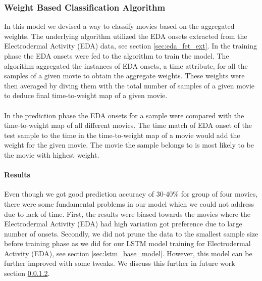 \subsubsection{Weight Based Classification Algorithm} In this model we devised a way to classify movies based on the aggregated weights. The underlying algorithm utilized the EDA onsets extracted from the Electrodermal Activity (EDA) data, see section \ref{sec:eda_fet_ext}. In the training phase the EDA onsets were fed to the algorithm to train the model. The algorithm aggregated the instances of EDA onsets, a time attribute, for all the samples of a given movie to obtain the aggregate weights. These weights were then averaged by diving them with the total number of samples of a given movie to deduce final time-to-weight map of a given movie.
\paragraph{} In the prediction phase the EDA onsets for a sample were compared with the time-to-weight map of all different movies. The time match of EDA onset of the test sample to the time in the time-to-weight map of a movie would add the weight for the given movie. The movie the sample belongs to is most likely to be the movie with highest weight.
\paragraph{Results} Even though we got good prediction accuracy of 30-40\% for group of four movies, there were some fundamental problems in our model which we could not address due to lack of time. First, the results were biased towards the movies where the Electrodermal Activity (EDA) had high variation got preference due to large number of onsets. Secondly, we did not prune the data to the smallest sample size before training phase as we did for our LSTM model training for Electrodermal Activity (EDA), see section \ref{sec:lstm_base_model}. However, this model can be further improved with some tweaks. We discuss this further in future work section \ref{}.

